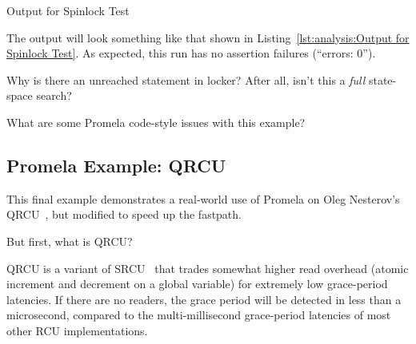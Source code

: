 \begin{listing}[htbp]
\vspace*{-9pt}
\caption{Output for Spinlock Test}
\label{lst:analysis:Output for Spinlock Test}
\end{listing}

The output will look something like that shown in
Listing~\ref{lst:analysis:Output for Spinlock Test}.
As expected, this run has no assertion failures (``errors: 0'').

\QuickQuiz{}
	Why is there an unreached statement in
	locker?  After all, isn't this a \emph{full} state-space
	search?
 \QuickQuizEnd

\QuickQuiz{}
	What are some Promela code-style issues with this example?
 \QuickQuizEnd


\subsection{Promela Example: QRCU}
\label{sec:formal:Promela Example: QRCU}

This final example demonstrates a real-world use of Promela on Oleg
Nesterov's
QRCU~\cite{OlegNesterov2006QRCU,OlegNesterov2006aQRCU},
but modified to speed up the 
fastpath.

But first, what is QRCU?

QRCU is a variant of SRCU~\cite{PaulEMcKenney2006c}
that trades somewhat higher read overhead
(atomic increment and decrement on a global variable) for extremely
low grace-period latencies.
If there are no readers, the grace period will be detected in less
than a microsecond, compared to the multi-millisecond grace-period
latencies of most other RCU implementations.

